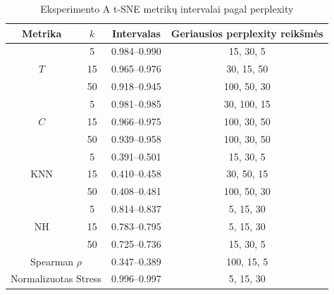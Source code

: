 \begin{table}[H]
\centering
\caption{Eksperimento A t-SNE metrikų intervalai pagal perplexity}
\label{tab:tsne_A}
\begin{tabular}{|c|c|c|c|}
\hline
Metrika & $k$ & Intervalas & Geriausios perplexity reikšmės \\
\hline
\multirow{3}{*}{$T$} & \num{5} & \num{0.984}--\num{0.990} & \num{15}, \num{30}, \num{5} \\
\cline{2-4}
 & \num{15} & \num{0.965}--\num{0.976} & \num{30}, \num{15}, \num{50} \\
\cline{2-4}
 & \num{50} & \num{0.918}--\num{0.945} & \num{100}, \num{50}, \num{30} \\
\hline
\multirow{3}{*}{$C$} & \num{5} & \num{0.981}--\num{0.985} & \num{30}, \num{100}, \num{15} \\
\cline{2-4}
 & \num{15} & \num{0.966}--\num{0.975} & \num{100}, \num{30}, \num{50} \\
\cline{2-4}
 & \num{50} & \num{0.939}--\num{0.958} & \num{100}, \num{30}, \num{50} \\
\hline
\multirow{3}{*}{KNN} & \num{5} & \num{0.391}--\num{0.501} & \num{15}, \num{30}, \num{5} \\
\cline{2-4}
 & \num{15} & \num{0.410}--\num{0.458} & \num{30}, \num{50}, \num{15} \\
\cline{2-4}
 & \num{50} & \num{0.408}--\num{0.481} & \num{100}, \num{50}, \num{30} \\
\hline
\multirow{3}{*}{NH} & \num{5} & \num{0.814}--\num{0.837} & \num{5}, \num{15}, \num{30} \\
\cline{2-4}
 & \num{15} & \num{0.783}--\num{0.795} & \num{5}, \num{15}, \num{30} \\
\cline{2-4}
 & \num{50} & \num{0.725}--\num{0.736} & \num{15}, \num{30}, \num{5} \\
\hline
\multicolumn{2}{|c|}{Spearman $\rho$} & \num{0.347}--\num{0.389} & \num{100}, \num{15}, \num{5} \\
\hline
\multicolumn{2}{|c|}{Normalizuotas Stress} & \num{0.996}--\num{0.997} & \num{5}, \num{15}, \num{30} \\
\hline
\end{tabular}
\end{table}

